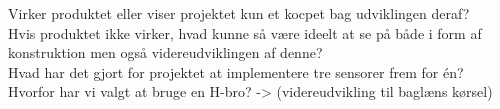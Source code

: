 Virker produktet eller viser projektet kun et kocpet bag udviklingen deraf? 
\\
Hvis produktet ikke virker, hvad kunne så være ideelt at se på både i form af konstruktion men også videreudviklingen af denne?
\\
Hvad har det gjort for projektet at implementere tre sensorer frem for én?
\\
Hvorfor har vi valgt at bruge en H-bro? -> (videreudvikling til baglæns kørsel)
\\
